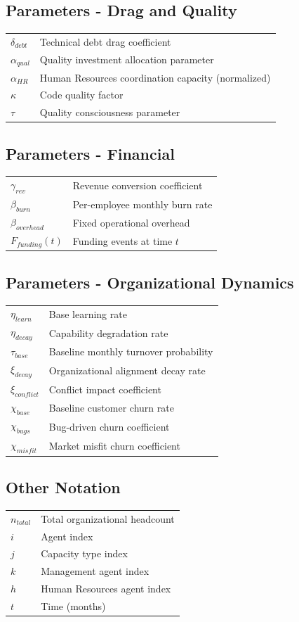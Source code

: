 \documentclass[alpha-refs]{wiley-article}
\begin{document}
\subsection*{Parameters - Drag and Quality}
\begin{tabular}{ll}
$\delta_{debt}$ & Technical debt drag coefficient \\
$\alpha_{qual}$ & Quality investment allocation parameter \\
$\alpha_{HR}$ & Human Resources coordination capacity (normalized) \\
$\kappa$ & Code quality factor \\
$\tau$ & Quality consciousness parameter
\end{tabular}

\subsection*{Parameters - Financial}
\begin{tabular}{ll}
$\gamma_{rev}$ & Revenue conversion coefficient \\
$\beta_{burn}$ & Per-employee monthly burn rate \\
$\beta_{overhead}$ & Fixed operational overhead \\
$F_{funding}(t)$ & Funding events at time $t$
\end{tabular}

\subsection*{Parameters - Organizational Dynamics}
\begin{tabular}{ll}
$\eta_{learn}$ & Base learning rate \\
$\eta_{decay}$ & Capability degradation rate \\
$\tau_{base}$ & Baseline monthly turnover probability \\
$\xi_{decay}$ & Organizational alignment decay rate \\
$\xi_{conflict}$ & Conflict impact coefficient \\
$\chi_{base}$ & Baseline customer churn rate \\
$\chi_{bugs}$ & Bug-driven churn coefficient \\
$\chi_{misfit}$ & Market misfit churn coefficient
\end{tabular}

\subsection*{Other Notation}
\begin{tabular}{ll}
$n_{total}$ & Total organizational headcount \\
$i$ & Agent index \\
$j$ & Capacity type index \\
$k$ & Management agent index \\
$h$ & Human Resources agent index \\
$t$ & Time (months)
\end{tabular}
\end{document}
